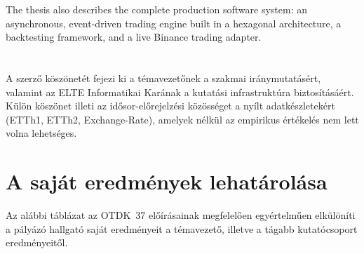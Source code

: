 \documentclass[
]{elteikthesis}[2024/04/26]
\begin{document}
The thesis also describes the complete production software system: an
asynchronous, event-driven trading engine built in a hexagonal architecture,
a backtesting framework, and a live Binance trading adapter.

\cleardoublepage

\tableofcontents
\cleardoublepage



\cleardoublepage


\cleardoublepage


\cleardoublepage


\cleardoublepage


\cleardoublepage

\chapter*{\acklabel}
A szerző köszönetét fejezi ki a témavezetőnek a szakmai iránymutatásért,
valamint az ELTE Informatikai Karának a kutatási infrastruktúra biztosításáért.
Külön köszönet illeti az idősor-előrejelzési közösséget a nyílt adatkészletekért
(ETTh1, ETTh2, Exchange-Rate), amelyek nélkül az empirikus értékelés nem lett volna lehetséges.

\chapter*{A saját eredmények lehatárolása}

Az alábbi táblázat az OTDK~37 előírásainak megfelelően egyértelműen elkülöníti
a pályázó hallgató saját eredményeit a témavezető, illetve a tágabb kutatócsoport
eredményeitől.
\end{document}
